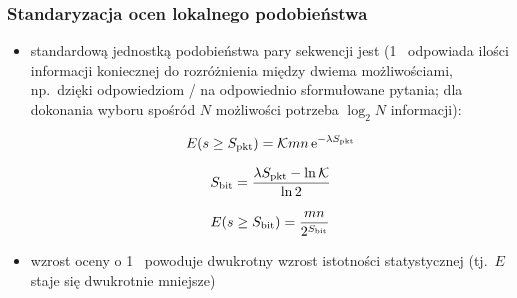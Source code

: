 \begin{frame}
\frametitle{Standaryzacja ocen lokalnego podobieństwa}

\begin{itemize}\scriptsize

 \item standardową jednostką podobieństwa pary sekwencji jest
  (1~ odpowiada ilości informacji koniecznej do
 rozróżnienia między dwiema możliwościami, np.\ dzięki odpowiedziom
 / na odpowiednio sformułowane pytania; dla
 dokonania wyboru spośród $N$ możliwości potrzeba $\log_2N$ 
 informacji):

 {\[ E(s \ge S_{\rm{pkt}}) =
  \mathcal{K}mn\,{\rm{e}}^{-\lambda S_{\rm{pkt}}} \]}


{\[ S_{\rm{bit}} = \frac{\lambda S_{\rm{pkt}} - {\rm{ln}}\,\mathcal{K}}{{\rm{ln}}\,2} \]}

{\[ E(s\ge S_{\rm{bit}}) = \frac{mn}{2^{S_{\rm{bit}}}} \]}

\item wzrost oceny o 1~ powoduje dwukrotny wzrost istotności
statystycznej (tj.~$E$ staje się dwukrotnie mniejsze)
\end{itemize}

\end{frame}


